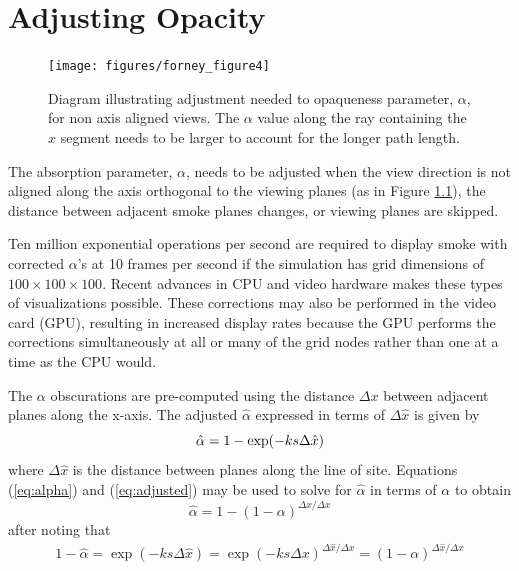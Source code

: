 \documentclass[11pt,twoside]{book}
\begin{document}
\chapter{Adjusting Opacity}

\begin{figure}[t]
\centerline{\texttt{[image: figures/forney\_figure4]}}
\caption [Diagram illustrating the adjustment needed to opaqueness
parameter, $\alpha$, for non axis aligned views.] { Diagram
illustrating adjustment needed to opaqueness parameter, $\alpha$,
for non axis aligned views. The $\alpha$ value along the ray
containing the $\hat{x}$ segment needs to be larger to account for
the longer path length. } \label{figray}
\end{figure}
The absorption parameter, $\alpha$, needs to be adjusted when the
view direction is not aligned along the axis orthogonal to the
viewing planes (as in Figure \ref{figray}), the distance between
adjacent smoke planes changes, or viewing planes are skipped.

Ten million exponential operations per second are required to
display smoke with corrected $\alpha$'s at 10 frames per second if
the simulation has grid dimensions of $100\times 100\times 100$.
Recent advances in CPU and video hardware makes these types of
visualizations possible. These corrections may also be performed
in the video card (GPU), resulting in increased display rates
because the GPU performs the corrections simultaneously at all or
many of the grid nodes rather than one at a time as the CPU would.

The $\alpha$ obscurations are pre-computed using the distance
$\Delta x$ between adjacent planes along the x-axis. The adjusted
$\hat{\alpha}$ expressed in terms of $\Delta\hat{x}$ is given by
\begin{equation}
\label{eq:adjusted}
\hat{\alpha}=1-\exp(-ks\Delta \hat{x})\\
\end{equation}
where $\Delta\hat{x}$ is the distance between planes along the line of site.
Equations (\ref{eq:alpha}) and (\ref{eq:adjusted}) may be used to
solve for $\hat{\alpha}$ in terms of $\alpha$ to obtain
\begin{equation}
\label{eq:alphahat}
\hat{\alpha}=1-(1-\alpha)^{\Delta\hat{x}/\Delta x}
\end{equation}
after noting that
\begin{eqnarray*}
1-\hat{\alpha}=\exp(-ks\Delta\hat{x})=\exp(-ks\Delta
x)^{\Delta\hat{x}/\Delta x}=(1-\alpha)^{\Delta\hat{x}/\Delta x}
\end{eqnarray*}
\end{document}
